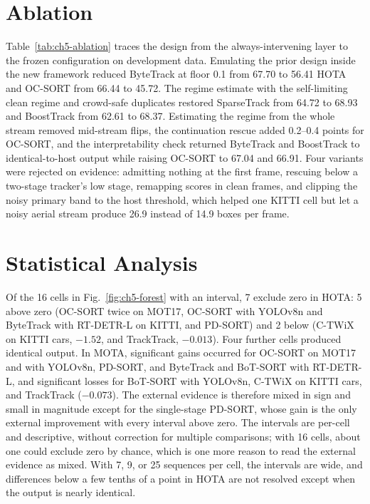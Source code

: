 \section{Ablation}\label{sec:ch5-ablation}
Table~\ref{tab:ch5-ablation} traces the design from the always-intervening layer to the frozen configuration on development data. Emulating the prior design inside the new framework reduced ByteTrack at floor 0.1 from 67.70 to 56.41 HOTA and OC-SORT from 66.44 to 45.72. The regime estimate with the self-limiting clean regime and crowd-safe duplicates restored SparseTrack from 64.72 to 68.93 and BoostTrack from 62.61 to 68.37. Estimating the regime from the whole stream removed mid-stream flips, the continuation rescue added 0.2--0.4 points for OC-SORT, and the interpretability check returned ByteTrack and BoostTrack to identical-to-host output while raising OC-SORT to 67.04 and 66.91. Four variants were rejected on evidence: admitting nothing at the first frame, rescuing below a two-stage tracker's low stage, remapping scores in clean frames, and clipping the noisy primary band to the host threshold, which helped one KITTI cell but let a noisy aerial stream produce 26.9 instead of 14.9 boxes per frame.

\section{Statistical Analysis}\label{sec:ch5-stats}
Of the 16 cells in Fig.~\ref{fig:ch5-forest} with an interval, 7 exclude zero in HOTA: 5 above zero (OC-SORT twice on MOT17, OC-SORT with YOLOv8n and ByteTrack with RT-DETR-L on KITTI, and PD-SORT) and 2 below (C-TWiX on KITTI cars, $-1.52$, and TrackTrack, $-0.013$). Four further cells produced identical output. In MOTA, significant gains occurred for OC-SORT on MOT17 and with YOLOv8n, PD-SORT, and ByteTrack and BoT-SORT with RT-DETR-L, and significant losses for BoT-SORT with YOLOv8n, C-TWiX on KITTI cars, and TrackTrack ($-0.073$). The external evidence is therefore mixed in sign and small in magnitude except for the single-stage PD-SORT, whose gain is the only external improvement with every interval above zero. The intervals are per-cell and descriptive, without correction for multiple comparisons; with 16 cells, about one could exclude zero by chance, which is one more reason to read the external evidence as mixed. With 7, 9, or 25 sequences per cell, the intervals are wide, and differences below a few tenths of a point in HOTA are not resolved except when the output is nearly identical.

